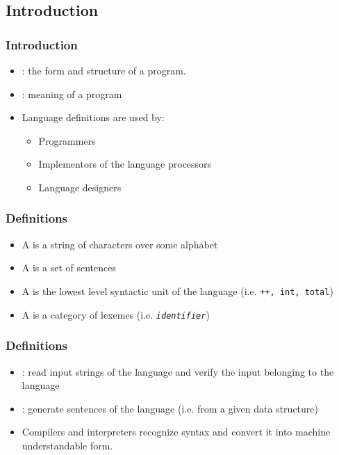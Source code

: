 \subsection{Introduction}
\begin{frame}
\frametitle{Introduction}
\begin{itemize}
\item {}: the form and structure of a program.
\item {}: meaning of a program
\item Language definitions are used by:
\begin{itemize}
\item Programmers
\item Implementors of the language processors
\item Language designers
\end{itemize}
\end{itemize}
\end{frame}

\begin{frame}
\frametitle{Definitions}
\begin{itemize}
\item A   is a string of characters over some alphabet
\item A  is a set of sentences
\item A  is the lowest level syntactic unit of the language
	(i.e. \texttt{++, int, total})
\item A  is a category of lexemes (i.e. \texttt{\em identifier\/})
\end{itemize}
\end{frame}


\begin{frame}
\frametitle{Definitions}
\begin{itemize}
\item {}: read input strings of the language and verify the input belonging to the language
\item {}: generate sentences of the language (i.e. from a 
given data structure)
\item Compilers and interpreters recognize syntax and convert it into machine understandable form.
\end{itemize}
\end{frame}

